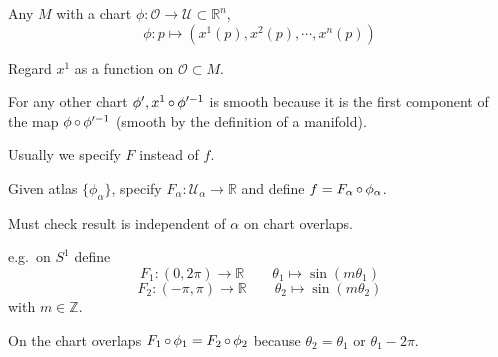 \documentclass[a4paper,11pt]{article}
\begin{document}
	\begin{ex}
		Any $M$ with a chart $\phi: \mathcal{O} \to \mathcal{U} \subset \mathbb{R}^n$,
		$$\phi: p \mapsto (x^1(p),x^2(p), \cdots, x^n(p))$$

		Regard $x^1$ as a function on $\mathcal{O} \subset M$.

		For any other chart $\phi', x^1 \operatorname{\circ} \phi'^{-1}$ is smooth because it is the first component of the map $ \phi \operatorname{\circ} \phi'^{-1}$ (smooth by the definition of a manifold).
	\end{ex}

	\begin{ex}
		Usually we specify $F$ instead of $f$.

		Given atlas $\{\phi_\alpha\}$, specify $F_\alpha: \mathcal{U}_\alpha \to \mathbb{R}$ and define $f = F_\alpha \operatorname{\circ} \phi_\alpha$.

		Must check result is independent of $\alpha$ on chart overlaps.

		e.g.\ on $S^1$ define
		\[
			F_1 : (0,2\pi) \to \mathbb{R} \qquad \theta_1 \mapsto \sin(m \theta_1)
		\]
		\[
			F_2 : (-\pi,\pi) \to \mathbb{R} \qquad \theta_2 \mapsto \sin(m\theta_2)
		\]
		with $ m \in \mathbb{Z}$.

		On the chart overlaps $F_1 \operatorname{\circ} \phi_1 = F_2 \operatorname{\circ} \phi_2$ because $\theta_2 = \theta_1$ or $\theta_1 - 2\pi$.
	\end{ex}
\end{document}
